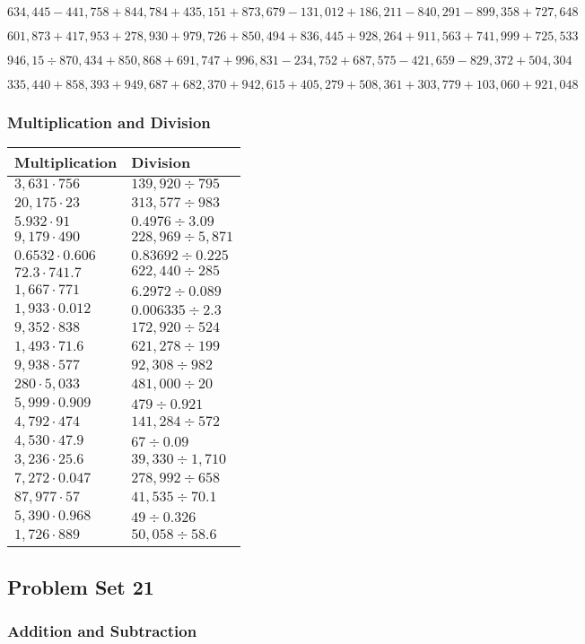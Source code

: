 \(634,445-441,758+844,784+435,151+873,679-131,012+186,211-840,291-899,358+727,648\)

\(601,873+417,953+278,930+979,726+850,494+836,445+928,264+911,563+741,999+725,533\)

\(946,15÷870,434+850,868+691,747+996,831-234,752+687,575-421,659-829,372+504,304\)

\(335,440+858,393+949,687+682,370+942,615+405,279+508,361+303,779+103,060+921,048\)

\hypertarget{multiplication-and-division-324}{%
\subsubsection{Multiplication and
Division}\label{multiplication-and-division-324}}

\begin{longtable}[]{@{}ll@{}}
\toprule
Multiplication & Division\tabularnewline
\midrule
\endhead
\(3,631\cdot756\) & \(139,920÷795\)\tabularnewline
\(20,175\cdot23\) & \(313,577÷983\)\tabularnewline
\(5.932\cdot91\) & \(0.4976 ÷3.09\)\tabularnewline
\(9,179\cdot490\) & \(228,969÷5,871\)\tabularnewline
\(0.6532\cdot0.606\) & \(0.83692÷0.225\)\tabularnewline
\(72.3\cdot741.7\) & \(622,440÷285\)\tabularnewline
\(1,667\cdot771\) & \(6.2972÷0.089\)\tabularnewline
\(1,933\cdot0.012\) & \(0.006335÷2.3\)\tabularnewline
\(9,352\cdot838\) & \(172,920÷524\)\tabularnewline
\(1,493\cdot71.6\) & \(621,278÷199\)\tabularnewline
\(9,938\cdot577\) & \(92,308÷982\)\tabularnewline
\(280\cdot5,033\) & \(481,000÷20\)\tabularnewline
\(5,999\cdot0.909\) & \(479÷0.921\)\tabularnewline
\(4,792\cdot474\) & \(141,284÷572\)\tabularnewline
\(4,530\cdot47.9\) & \(67÷0.09\)\tabularnewline
\(3,236\cdot25.6\) & \(39,330÷1,710\)\tabularnewline
\(7,272\cdot0.047\) & \(278,992÷658\)\tabularnewline
\(87,977\cdot57\) & \(41,535÷70.1\)\tabularnewline
\(5,390\cdot0.968\) & \(49÷0.326\)\tabularnewline
\(1,726\cdot889\) & \(50,058÷58.6\)\tabularnewline
\bottomrule
\end{longtable}

\hypertarget{problem-set-21-5}{%
\subsection{Problem Set 21}\label{problem-set-21-5}}

\hypertarget{addition-and-subtraction-326}{%
\subsubsection{Addition and
Subtraction}\label{addition-and-subtraction-326}}

